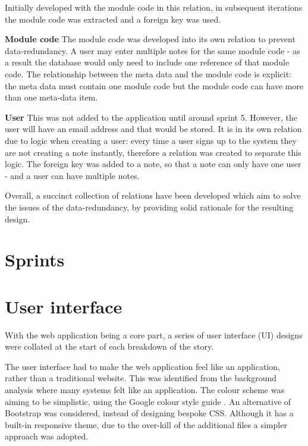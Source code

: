 Initially developed with the module code in this relation, in subsequent iterations the module code was extracted and a foreign key was used.

\noindent
\textbf{Module code}
\newline
The module code was developed into its own relation to prevent data-redundancy. A user may enter multiple notes for the same module code - as a result the database would only need to include one reference of that module code. The relationship between the meta data and the module code is explicit: the meta data must contain one module code but the module code can have more than one meta-data item.

\noindent
\textbf{User}
\newline
This was not added to the application until around sprint 5. However, the user will have an email address and that would be stored. It is in its own relation due to logic when creating a user: every time a user signs up to the system they are not creating a note instantly, therefore a relation was created to separate this logic. The foreign key was added to a note, so that a note can only have one user - and a user can have multiple notes.


\noindent
Overall, a succinct collection of relations have been developed which aim to solve the issues of the data-redundancy, by providing solid rationale for the resulting design.


\section{Sprints}

\section{User interface}
With the web application being a core part, a series of user interface (UI) designs were collated at the start of each breakdown of the story.

The user interface had to make the web application feel like an application, rather than a traditional website. This was identified from the background analysis where many systems felt like an application. The colour scheme was aiming to be simplistic, using the Google colour style guide \cite{citeulike:14023831}. An alternative of Bootstrap \cite{citeulike:13995818} was considered, instead of designing bespoke CSS. Although it has a built-in responsive theme, due to the over-kill of the additional files a simpler approach was adopted.


